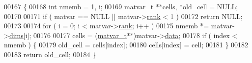 \begin{DoxyCode}
00167 \{
00168     \textcolor{keywordtype}{int} nmemb = 1, i;
00169     \hyperlink{group___m_a_t_structmatvar__t}{matvar\_t} **cells, *old\_cell = NULL;
00170 
00171     \textcolor{keywordflow}{if} ( matvar == NULL || matvar->\hyperlink{group___m_a_t_a84ba70c96ded13cc555fa75b768d9921}{rank} < 1 )
00172         \textcolor{keywordflow}{return} NULL;
00173 
00174     \textcolor{keywordflow}{for} ( i = 0; i < matvar->\hyperlink{group___m_a_t_a84ba70c96ded13cc555fa75b768d9921}{rank}; i++ )
00175         nmemb *= matvar->\hyperlink{group___m_a_t_a8e01234e1c862ce3472bb37f5a09b92c}{dims}[i];
00176 
00177     cells = (\hyperlink{group___m_a_t_structmatvar__t}{matvar\_t}**)matvar->\hyperlink{group___m_a_t_a5672978efa230bbdecdf38ede781f7fa}{data};
00178     \textcolor{keywordflow}{if} ( index < nmemb ) \{
00179         old\_cell = cells[index];
00180         cells[index] = cell;
00181     \}
00182 
00183     \textcolor{keywordflow}{return} old\_cell;
00184 \}
\end{DoxyCode}
